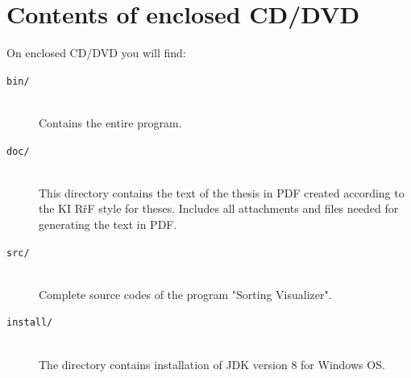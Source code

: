 \documentclass[
  field=inf,
  biblatex,
  language=english,
  glossaries,
  theorems=false,
  sourcecodes=false,
  index
]{kidiplom}
\begin{document}
\section{Contents of enclosed CD/DVD} \label{sec:CDcontents}

On enclosed CD/DVD you will find:

\begin{description}

\item[\texttt{bin/}] \hfill \\
Contains the entire program.

\item[\texttt{doc/}] \hfill \\
This directory contains the text of the thesis in PDF created according to the KI RřF style for theses. Includes all attachments and files needed for generating the text in PDF.

\item[\texttt{src/}] \hfill \\
Complete source codes of the program "Sorting Visualizer".

\item[\texttt{install/}] \hfill \\
The directory contains installation of JDK version 8 for Windows OS. 

\end{description}



\printglossary


\nocite{*}
\printbibliography
\end{document}
